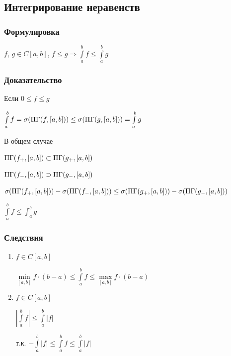 \documentclass{article}
\begin{document}
		\subsection{Интегрирование неравенств}
		
			\subsubsection{Формулировка}
                
                $f$, $g \in C[a, b]$, $f \leq g \Rightarrow \int\limits^b_a f \leq \int\limits^b_a g$
			
            \subsubsection{Доказательство}
            
                Если $0 \leq f \leq g$
			
                $\int\limits^b_a f = \sigma (\Pi\Gamma (f, [a, b])) \leq \sigma (\Pi\Gamma (g, [a, b])) = \int\limits^b_a g$
			
                В общем случае
			
                $\Pi\Gamma(f_+, [a, b]) \subset \Pi\Gamma(g_+, [a, b])$
			
                $\Pi\Gamma(f_-, [a, b]) \supset \Pi\Gamma(g_-, [a, b])$
			
                $\sigma (\Pi\Gamma(f_+, [a, b])) - \sigma (\Pi\Gamma(f_-, [a, b])) \leq \sigma (\Pi\Gamma(g_+, [a, b])) - \sigma (\Pi\Gamma(g_-, [a, b]))$
			
                $\int\limits^b_a f \leq \int^b_a g$
			
			\subsubsection{Следствия}
			
                \begin{enumerate}
                
                    \item $f \in C[a, b]$
                    
                        $\min\limits_{[a, b]} f \cdot (b - a) \leq \int\limits^b_a f \leq \max\limits_{[a, b]} f \cdot (b - a)$
                        
                    \item $f \in C[a, b]$
                    
                        $\left| \int\limits^b_a f \right| \leq \int\limits^b_a \left| f \right|$
                        
                        т.к. $- \int\limits^b_a \left| f \right| \leq \int\limits^b_a f \leq \int\limits^b_a \left| f \right|$
                        
                \end{enumerate}
                
\end{document}
